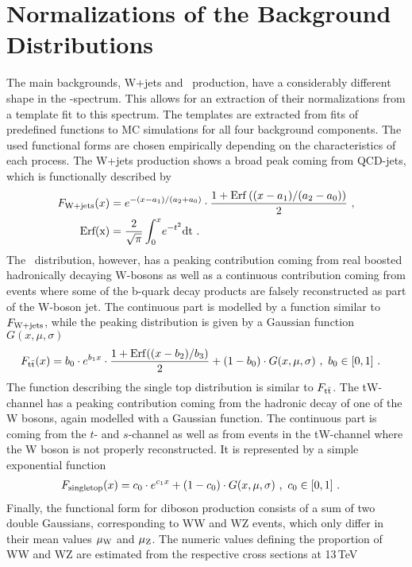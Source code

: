 \section{Normalizations of the Background Distributions}
\label{sec:bkgnorms}
The main backgrounds, W+jets and \ttbar \ production, have a considerably different shape in the \Mpr -spectrum. This allows for an extraction of their normalizations from a template fit to this spectrum. The templates are extracted from fits of predefined functions to MC simulations for all four background components. The used functional forms are chosen empirically depending on the characteristics of each process. The W+jets production shows a broad peak coming from QCD-jets, which is functionally described by
\begin{align}
F_{\rm W+jets}(x) &= e^{-(x-a_1)/\left(a_2+a_0\right)} \cdot \frac{1 + {\rm Erf}\left((x-a_1)/(a_2-a_0) \right)}{2} ~ , \\
{\rm Erf(x)} &= \frac{2}{\sqrt{\pi}}\int_0^x \! e^{-t^2}{\rm dt} ~ .
\end{align}
The \ttbar \ distribution, however, has a peaking contribution coming from real boosted hadronically decaying W-bosons as well as a continuous contribution coming from events where some of the b-quark decay products are falsely reconstructed as part of the W-boson jet. The continuous part is modelled by a function similar to $F_{\rm W+jets}$, while the peaking distribution is given by a Gaussian function $G(x,\mu,\sigma)$
\begin{align}
F_{\mathrm{t}\bar{\mathrm{t}}}(x) &= b_0 \cdot e^{b_1 x} \cdot \frac{1 + {\rm Erf}((x-b_2)/b_3)}{2} + (1-b_0)\cdot G(x,\mu,\sigma) ~ , ~ b_0 \in [0,1] ~ .
\end{align}
The function describing the single top distribution is similar to $F_{\mathrm{t}\bar{\mathrm{t}}}$. The tW-channel has a peaking contribution coming from the hadronic decay of one of the W bosons, again modelled with a Gaussian function. The continuous part is coming from the $t$- and $s$-channel as well as from events in the tW-channel where the W boson is not properly reconstructed. It is represented by a simple exponential function
\begin{align}
F_{\rm singletop}(x) &= c_0\cdot e^{c_1 x} + (1-c_0)\cdot G(x,\mu,\sigma) ~ , ~ c_0 \in [0,1] ~ .
\end{align}
Finally, the functional form for diboson production consists of a sum of two double Gaussians, corresponding to WW and WZ events, which only differ in their mean values $\mu_{\rm W}$ and $\mu_{\rm Z}$. The numeric values defining the proportion of WW and WZ are estimated from the respective cross sections at 13\,TeV \cite{WWxsec,WZxsec}
